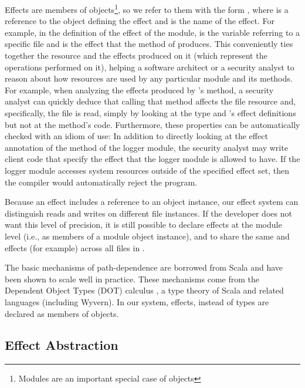Effects are members of objects\footnote{Modules are an important special case of objects}, so we refer to them with the form , where  is a reference to the object defining the effect and  is the name of the effect. For example, in the definition of the  effect of the  module,  is the variable referring to a specific file and  is the effect that the  method of  produces. This conveniently ties together the resource and the effects produced on it (which represent the operations performed on it), helping a software architect or a security analyst to reason about how resources are used by any particular module and its methods. For example, when analyzing the effects produced by 's  method, a security analyst can quickly deduce that calling that method affects the file resource and, specifically, the file is read, simply by looking at the  type and 's effect definitions but not at the method's code. Furthermore, these properties can be automatically checked with an idiom of use: In addition to directly looking at the effect annotation of the method of the logger module, the security analyst may write client code that specify the effect that the logger module is allowed to have. If the logger module accesses system resources outside of the specified effect set, then the compiler would automatically reject the program.

Because an effect includes a reference to an object instance, our effect system can distinguish reads and writes on different file instances. If the developer does not want this level of precision, it is still possible to declare effects at the module level (i.e., as members of a  module object instance), and to share the same  and  effects (for example) across all files in .

The basic mechanisms of path-dependence are borrowed from Scala and have been shown to scale well in practice. These mechanisms come from the Dependent Object Types (DOT) calculus \cite{amin14}, a type theory of Scala and related languages (including Wyvern). In our system, effects, instead of types are declared as members of objects.

\subsection{Effect Abstraction}
\label{sec:effect-abstraction}


